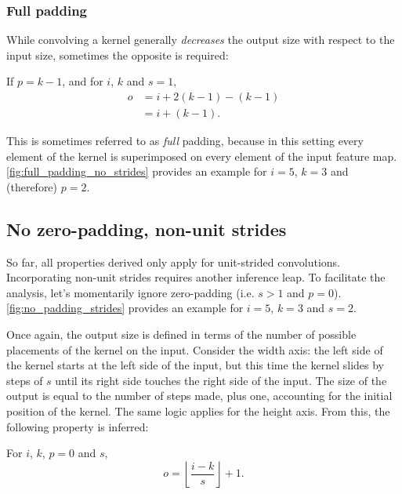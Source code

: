 \documentclass{article}
\begin{document}
\subsubsection{Full padding}

While convolving a kernel generally {\em decreases} the output size with respect
to the input size, sometimes the opposite is required:

\begin{prop}\label{prop:full_padding_no_strides}
If $p = k - 1$, and for $i$, $k$ and $s = 1$,
\begin{equation*}
\begin{split}
    o &= i + 2(k - 1) - (k - 1) \\
      &= i + (k - 1).
\end{split}
\end{equation*}
\end{prop}

This is sometimes referred to as {\em full} padding, because in this setting
every element of the kernel is superimposed on every element of the input
feature map. \autoref{fig:full_padding_no_strides} provides an example for $i =
5$, $k = 3$ and (therefore) $p = 2$.

\subsection{No zero-padding, non-unit strides}

So far, all properties derived only apply for unit-strided convolutions.
Incorporating non-unit strides requires another inference leap. To facilitate
the analysis, let's momentarily ignore zero-padding (i.e.  $s > 1$ and $p = 0$).
\autoref{fig:no_padding_strides} provides an example for $i = 5$, $k = 3$ and $s
= 2$.

Once again, the output size is defined in terms of the number of possible
placements of the kernel on the input. Consider the width axis: the left side of
the kernel starts at the left side of the input, but this time the kernel slides
by steps of $s$ until its right side touches the right side of the input. The
size of the output is equal to the number of steps made, plus one, accounting
for the initial position of the kernel. The same logic applies for the height
axis. From this, the following property is inferred:

\begin{prop}\label{prop:no_padding_strides}
For $i$, $k$, $p = 0$ and $s$,
\begin{equation*}
    o = \left\lfloor \frac{i - k}{s} \right\rfloor + 1.
\end{equation*}
\end{prop}
\end{document}

